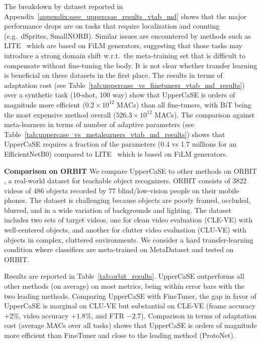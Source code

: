 \documentclass{article}
\begin{document}
The breakdown by dataset reported in Appendix~\ref{appendix:ssec_uppercsae_results_vtab_md} shows that the major performance drops are on tasks that require localization and counting (e.g.~dSprites, SmallNORB). Similar issues are encountered by methods such as LITE~\citep{bronskill2021memory} which are based on FiLM generators, suggesting that those tasks may introduce a strong domain shift w.r.t.~the meta-training set that is difficult to compensate without fine-tuning the body. It is not clear whether transfer learning is beneficial on these datasets in the first place. The results in terms of adaptation cost (see Table~\ref{tab:uppercase_vs_finetuners_vtab_md_results}) over a synthetic task (10-shot, 100 way) show that UpperCaSE is orders of magnitude more efficient ($0.2 \times 10^{12}$ MACs) than all fine-tuners, with BiT being the most expensive method overall ($526.3 \times 10^{12}$ MACs). The comparison against meta-learners in terms of number of adaptive parameters (see Table~\ref{tab:uppercase_vs_metalearners_vtab_md_results}) shows that UpperCaSE requires a fraction of the parameters (0.4 vs 1.7 millions for an EfficientNetB0) compared to LITE~\citep{bronskill2021memory} which is based on FiLM generators.


\textbf{Comparison on ORBIT} We compare UpperCaSE to other methods on ORBIT \citep{massiceti2021orbit}, a real-world dataset for teachable object recognizers. ORBIT consists of 3822 videos of 486 objects recorded by 77 blind/low-vision people on their mobile phones. The dataset is challenging because objects are poorly framed, occluded, blurred, and in a wide variation of backgrounds and lighting. The dataset includes two sets of target videos, one for clean video evaluation (CLE-VE) with well-centered objects, and another for clutter video evaluation (CLU-VE) with objects in complex, cluttered environments. We consider a hard transfer-learning condition where classifiers are meta-trained on MetaDataset and tested on ORBIT. 

Results are reported in Table~\ref{tab:orbit_results}. UpperCaSE outperforms all other methods (on average) on most metrics, being within error bars with the two leading methods. Comparing UpperCaSE with FineTuner, the gap in favor of UpperCaSE is marginal on CLU-VE but substantial on CLE-VE (frame accuracy $+2\%$, video accuracy $+1.8\%$, and FTR $-2.7$). Comparison in terms of adaptation cost (average MACs over all tasks) shows that UpperCaSE is orders of magnitude more efficient than FineTuner and close to the leading method (ProtoNet).
\end{document}
